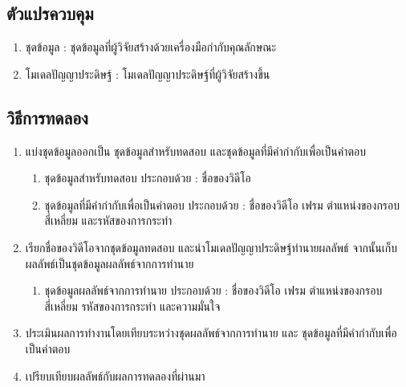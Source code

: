 \subsection*{ตัวแปรควบคุม}
	\begin{enumerate}
		\setlength\itemsep{-0.25em}
		\item ชุดข้อมูล : ชุดข้อมูลที่ผู้วิจัยสร้างด้วยเครื่องมือกำกับคุณลักษณะ
		\item โมเดลปัญญาประดิษฐ์ : โมเดลปัญญาประดิษฐ์ที่ผู้วิจัยสร้างขึ้น
	\end{enumerate}
\subsection*{วิธีการทดลอง}
	\begin{enumerate}
		\setlength\itemsep{-0.25em}
		\item แบ่งชุดข้อมูลออกเป็น ชุดข้อมูลสำหรับทดสอบ และชุดข้อมูลที่มีคำกำกับเพื่อเป็นคำตอบ
			\begin{enumerate}
				\setlength\itemsep{-0.25em}
				\item ชุดข้อมูลสำหรับทดสอบ ประกอบด้วย : ชื่อของวิดีโอ
				\item ชุดข้อมูลที่มีคำกำกับเพื่อเป็นคำตอบ ประกอบด้วย : ชื่อของวิดีโอ เฟรม ตำแหน่งของกรอบสี่เหลี่ยม และรหัสของการกระทำ
			\end{enumerate}
		\item เรียกชื่อของวิดีโอจากชุดข้อมูลทดสอบ และนำโมเดลปัญญาประดิษฐ์ทำนายผลลัพธ์ จากนั้นเก็บผลลัพธ์เป็นชุดข้อมูลผลลัพธ์จากการทำนาย
			\begin{enumerate}
				\setlength\itemsep{-0.25em}
				\item ชุดข้อมูลผลลัพธ์จากการทำนาย ประกอบด้วย : ชื่อของวิดีโอ เฟรม ตำแหน่งของกรอบสี่เหลี่ยม รหัสของการกระทำ และความมั่นใจ
			\end{enumerate}
		\item ประเมินผลการทำงานโดยเทียบระหว่างชุดผลลัพธ์จากการทำนาย และ ชุดข้อมูลที่มีคำกำกับเพื่อเป็นคำตอบ	
		\item เปรียบเทียบผลลัพธ์กับผลการทดลองที่ผ่านมา
\end{enumerate}





